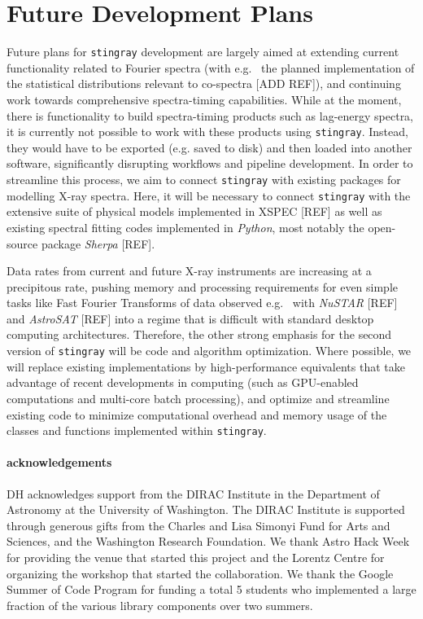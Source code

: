\documentclass[12pt]{emulateapj}
\newcommand{\stingray}{\texttt{stingray}\xspace}
\begin{document}
\section{Future Development Plans}
\label{sec:future}

Future plans for \stingray development are largely aimed at extending current functionality related to Fourier spectra (with e.g.~ the planned implementation of the statistical distributions relevant to co-spectra [ADD REF]), and continuing work towards comprehensive spectra-timing capabilities. While at the moment, there is functionality to build spectra-timing products such as lag-energy spectra, it is currently not possible to work with these products using \stingray. Instead, they would have to be exported (e.g. saved to disk) and then loaded into another software, significantly disrupting workflows and pipeline development. In order to streamline this process, we aim to connect \stingray with existing packages for modelling X-ray spectra. Here, it will be necessary to connect \stingray with the extensive suite of physical models implemented in XSPEC [REF] as well as existing spectral fitting codes implemented in \textit{Python}, most notably the open-source package \textit{Sherpa} [REF].

Data rates from current and future X-ray instruments are increasing at a precipitous rate, pushing memory and processing requirements for even simple tasks like Fast Fourier Transforms of data observed e.g.~ with \textit{NuSTAR} [REF] and \textit{AstroSAT} [REF] into a regime that is difficult with standard desktop computing architectures. Therefore, the other strong emphasis for the second version of \stingray will be code and algorithm optimization. Where possible, we will replace existing implementations by high-performance equivalents that take advantage of recent developments in computing (such as GPU-enabled computations and multi-core batch processing), and optimize and streamline existing code to minimize computational overhead and memory usage of the classes and functions implemented within \stingray. 

\paragraph{acknowledgements}
DH acknowledges support from the DIRAC Institute in the Department of Astronomy at the University of Washington. The DIRAC Institute is supported through generous gifts from the Charles and Lisa Simonyi Fund for Arts and Sciences, and the Washington Research Foundation.
We thank Astro Hack Week for providing the venue that started this project and the Lorentz Centre for organizing the workshop that started the collaboration. We thank the Google Summer of Code Program for funding a total 5 students who implemented a large fraction of the various library components over two summers.
\end{document}
